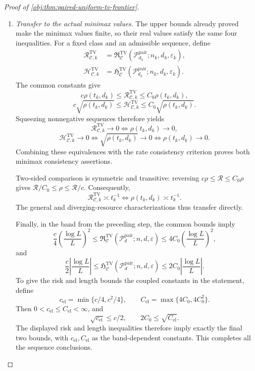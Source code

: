 \documentclass[11pt]{article}
\begin{document}
\begin{proof}[Proof of \cref{obj:thm:paired-uniform-tv-frontier}]
\begin{enumerate}
\item \textit{Transfer to the actual minimax values.}
The upper bounds already proved make the minimax values finite, so their real values satisfy the same four inequalities. For a fixed class and an admissible sequence, define
\[
\begin{aligned}
\mathcal R_{\mathcal C,k}^{\mathrm{TV}}
&=\mathfrak R^{\mathrm{TV}}_{\mathcal C}
(\mathcal P_{d_k}^{\mathrm{pair}};n_k,d_k,\varepsilon_k),\\
\mathcal H_{\mathcal C,k}^{\mathrm{TV}}
&=\mathfrak H^{\mathrm{TV}}_{\mathcal C}
(\mathcal P_{d_k}^{\mathrm{pair}};n_k,d_k,\varepsilon_k).
\end{aligned}
\]
The common constants give
\[
c\rho(t_k,d_k)\le\mathcal R_{\mathcal C,k}^{\mathrm{TV}}
\le C_0\rho(t_k,d_k),
\]
\[
c\sqrt{\rho(t_k,d_k)}
\le\mathcal H_{\mathcal C,k}^{\mathrm{TV}}
\le C_0\sqrt{\rho(t_k,d_k)}.
\]
Squeezing nonnegative sequences therefore yields
\[
\mathcal R_{\mathcal C,k}^{\mathrm{TV}}\to0
\Longleftrightarrow\rho(t_k,d_k)\to0,
\]
\[
\mathcal H_{\mathcal C,k}^{\mathrm{TV}}\to0
\Longleftrightarrow\sqrt{\rho(t_k,d_k)}\to0
\Longleftrightarrow\rho(t_k,d_k)\to0.
\]
Combining these equivalences with the rate consistency criterion proves both minimax consistency assertions.

Two-sided comparison is symmetric and transitive: reversing
\(c\rho\le\mathcal R\le C_0\rho\) gives
\(\mathcal R/C_0\le\rho\le\mathcal R/c\).
Consequently,
\[
\mathcal R_{\mathcal C,k}^{\mathrm{TV}}\asymp t_k^{-1}
\Longleftrightarrow
\rho(t_k,d_k)\asymp t_k^{-1}.
\]
The general and diverging-resource characterizations thus transfer directly.

Finally, in the band from the preceding step, the common bounds imply
\[
\frac c4\left(\frac{\log L}{L}\right)^2
\le
\mathfrak R^{\mathrm{TV}}_{\mathcal C}
(\mathcal P_d^{\mathrm{pair}};n,d,\varepsilon)
\le
4C_0\left(\frac{\log L}{L}\right)^2,
\]
and
\[
\frac c2\left|\frac{\log L}{L}\right|
\le
\mathfrak H^{\mathrm{TV}}_{\mathcal C}
(\mathcal P_d^{\mathrm{pair}};n,d,\varepsilon)
\le
2C_0\left|\frac{\log L}{L}\right|.
\]
To give the risk and length bounds the coupled constants in the statement, define
\[
c_{\mathrm{el}}=\min\{c/4,c^2/4\},
\qquad
C_{\mathrm{el}}=\max\{4C_0,4C_0^2\}.
\]
Then \(0<c_{\mathrm{el}}\le C_{\mathrm{el}}<\infty\), and
\[
\sqrt{c_{\mathrm{el}}}\le c/2,
\qquad
2C_0\le\sqrt{C_{\mathrm{el}}}.
\]
The displayed risk and length inequalities therefore imply exactly the final two bounds, with \(c_{\mathrm{el}},C_{\mathrm{el}}\) as the band-dependent constants. This completes all the sequence conclusions.
\end{enumerate}
\end{proof}
\end{document}
